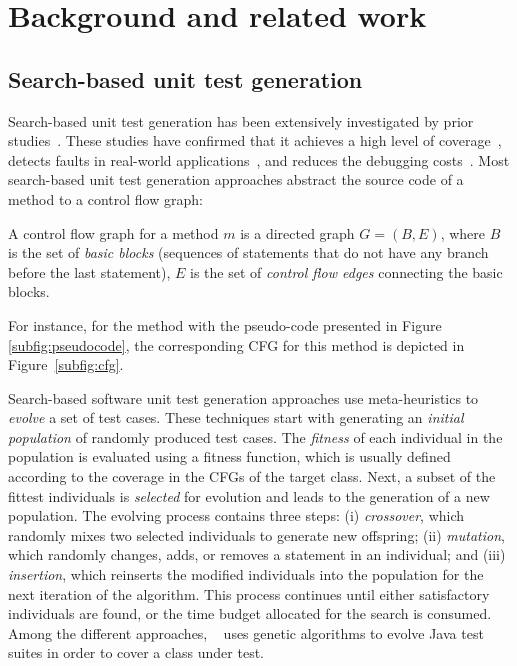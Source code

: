 
\section{Background and related work}
\label{sec:cub:background}

\subsection{Search-based unit test generation}
\label{sec:cub:unit-test-generation}

Search-based unit test generation has been extensively investigated by prior studies~\cite{Fraser2011, Fraser2014b, Panichella2018}. These studies have confirmed that it achieves a high level of coverage~\cite{Fraser2014b, Panichella2018}, detects faults in real-world applications~\cite{Fraser2015a,almasi2017industrial}, and reduces the debugging costs~\cite{Panichella2016}. 
Most search-based unit test generation approaches abstract the source code of a method to a control flow graph:
%
\begin{definition}
    A control flow graph for a method $m$ is a directed graph $G=(B,E)$, where $B$ is the set of \emph{basic blocks} (\ie sequences of statements that do not have any branch before the last statement), $E$ is the set of \emph{control flow edges} connecting the basic blocks.
\end{definition}
%
For instance, for the method with the pseudo-code presented in Figure \ref{subfig:pseudocode}, the corresponding CFG for this method is depicted in Figure~\ref{subfig:cfg}.

Search-based software unit test generation approaches use meta-heuristics to \emph{evolve} a set of test cases. These techniques start with generating an \emph{initial population} of randomly produced test cases.
The \emph{fitness} of each individual in the population is evaluated using a fitness function, which is usually defined according to the coverage in the CFGs of the target class. 
Next, a subset of the fittest individuals is \emph{selected} for evolution and leads to the generation of a new population. 
The evolving process contains three steps: (i) \emph{crossover}, which randomly mixes two selected individuals to generate new offspring; (ii) \emph{mutation}, which randomly changes, adds, or removes a statement in an individual; and (iii) \emph{insertion}, which reinserts the modified individuals into the population for the next iteration of the algorithm.
This process continues until either satisfactory individuals are found, or the time budget allocated for the search is consumed.
%
Among the different approaches, \evosuite~\cite{Fraser2011} uses genetic algorithms to evolve Java test suites in order to cover a class under test.

